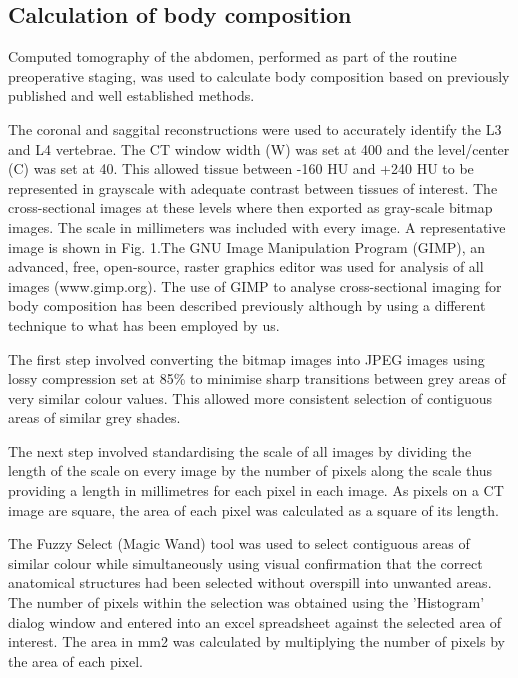 \subsection{Calculation of body composition}
Computed tomography of the abdomen, performed as part of the routine preoperative staging, was used to calculate body composition based on previously published and well established methods.\parencite{bredella_comparison_2010,shen_total_2004}

The coronal and saggital reconstructions were used to accurately identify the L3 and L4 vertebrae. The CT window width (W) was set at 400 and the level/center (C) was set at 40. This allowed tissue between -160 HU and +240 HU to be represented in grayscale with adequate contrast between tissues of interest. The cross-sectional images at these levels where then exported as gray-scale bitmap images. The scale in millimeters was included with every image. A representative image is shown in Fig. 1.The GNU Image Manipulation Program (GIMP), an advanced, free, open-source, raster graphics editor was used for analysis of all images (www.gimp.org). The use of GIMP to analyse cross-sectional imaging for body composition has been described previously although by using a different technique to what has been employed by us. \parencite{anblagan_measurement_2013}

The first step involved converting the bitmap images into JPEG images using lossy compression set at 85\% to minimise sharp transitions between grey areas of very similar colour values. This allowed more consistent selection of contiguous areas of similar grey shades. 

The next step involved standardising the scale of all images by dividing the length of the scale on every image by the number of pixels along the scale thus providing a length in millimetres for each pixel in each image. As pixels on a CT image are square, the area of each pixel was calculated as a square of its length. 

The Fuzzy Select (Magic Wand) tool was used to select contiguous areas of similar colour while simultaneously using visual confirmation that the correct anatomical structures had been selected without overspill into unwanted areas. The number of pixels within the selection was obtained using the 'Histogram' dialog window and entered into an excel spreadsheet against the selected area of interest. The area in mm2 was calculated by multiplying the number of pixels by the area of each pixel.


